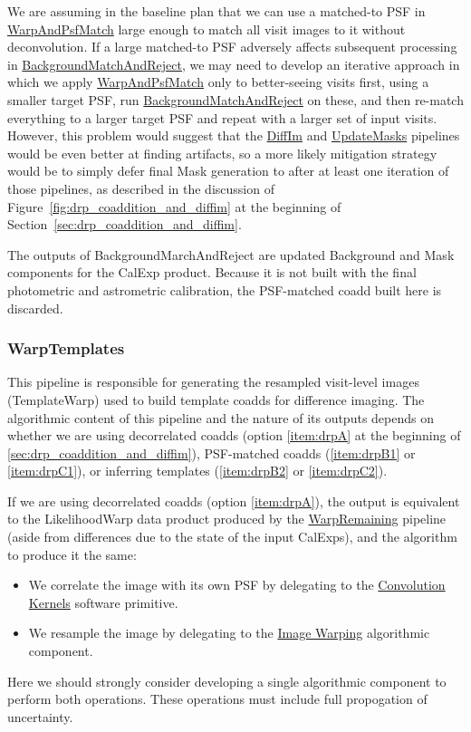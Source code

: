 We are assuming in the baseline plan that we can use a matched-to PSF in \hyperref[sec:drpWarpAndPsfMatch]{WarpAndPsfMatch} large enough to match all visit images to it without deconvolution.  If a large matched-to PSF adversely affects subsequent processing in \hyperref[sec:drpBackgroundMatchAndReject]{BackgroundMatchAndReject}, we may need to develop an iterative approach in which we apply \hyperref[sec:drpWarpAndPsfMatch]{WarpAndPsfMatch} only to better-seeing visits first, using a smaller target PSF, run \hyperref[sec:drpBackgroundMatchAndReject]{BackgroundMatchAndReject} on these, and then re-match everything to a larger target PSF and repeat with a larger set of input visits.  However, this problem would suggest that the \hyperref[sec:drpDiffIm]{DiffIm} and \hyperref[sec:drpUpdateMasks]{UpdateMasks} pipelines would be even better at finding artifacts, so a more likely mitigation strategy would be to simply defer final Mask generation to after at least one iteration of those pipelines, as described in the discussion of Figure~\ref{fig:drp_coaddition_and_diffim} at the beginning of Section~\ref{sec:drp_coaddition_and_diffim}.

The outputs of BackgroundMarchAndReject are updated Background and Mask components for the CalExp product.  Because it is not built with the final photometric and astrometric calibration, the PSF-matched coadd built here is discarded.

\subsubsection{WarpTemplates}
\label{sec:drpWarpTemplates}

This pipeline is responsible for generating the resampled visit-level images (TemplateWarp) used to build template coadds for difference imaging.  The algorithmic content of this pipeline and the nature of its outputs depends on whether we are using decorrelated coadds (option \ref{item:drpA} at the beginning of \ref{sec:drp_coaddition_and_diffim}), PSF-matched coadds (\ref{item:drpB1} or \ref{item:drpC1}), or inferring templates (\ref{item:drpB2} or \ref{item:drpC2}).

If we are using decorrelated coadds (option \ref{item:drpA}), the output is equivalent to the LikelihoodWarp data product produced by the \hyperref[sec:drpWarpRemaining]{WarpRemaining} pipeline (aside from differences due to the state of the input CalExps), and the algorithm to produce it the same:
\begin{itemize}
\item We correlate the image with its own PSF by delegating to the \hyperref[sec:spKernels]{Convolution Kernels} software primitive.
\item We resample the image by delegating to the \hyperref[sec:acWarping]{Image Warping} algorithmic component.
\end{itemize}
Here we should strongly consider developing a single algorithmic component to perform both operations.  These operations must include full propogation of uncertainty.

